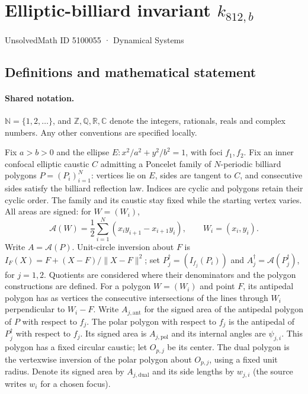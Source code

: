 \documentclass[11pt]{article}
\begin{document}
\setcounter{section}{5100054}
\section{Elliptic-billiard invariant $k_{812,b}$}\label{5100055}
{\small\sffamily UnsolvedMath ID 5100055 · Dynamical Systems}
\subsection{Definitions and mathematical statement}

\paragraph{Shared notation.}$\mathbb N=\{1,2,\ldots\}$, and $\mathbb Z,\mathbb Q,\mathbb R,\mathbb C$ denote the integers, rationals, reals and complex numbers. Any other conventions are specified locally.


Fix $a>b>0$ and the ellipse $E:x^2/a^2+y^2/b^2=1$, with foci $f_1,f_2$. Fix an inner confocal elliptic caustic $C$ admitting a Poncelet family of $N$-periodic billiard polygons $P=(P_i)_{i=1}^N$: vertices lie on $E$, sides are tangent to $C$, and consecutive sides satisfy the billiard reflection law. Indices are cyclic and polygons retain their cyclic order. The family and its caustic stay fixed while the starting vertex varies. All areas are signed: for $W=(W_i)$,
\[\mathcal A(W)=\frac12\sum_{i=1}^N(x_i y_{i+1}-x_{i+1}y_i),\qquad W_i=(x_i,y_i).\]
Write $A=\mathcal A(P)$. Unit-circle inversion about $F$ is $I_F(X)=F+(X-F)/\lVert X-F\rVert^2$; set $P_j^\dagger=(I_{f_j}(P_i))$ and $A_j^\dagger=\mathcal A(P_j^\dagger)$, for $j=1,2$. Quotients are considered where their denominators and the polygon constructions are defined. For a polygon $W=(W_i)$ and point $F$, its antipedal polygon has as vertices the consecutive intersections of the lines through $W_i$ perpendicular to $W_i-F$. Write $A_{j,\mathrm{ant}}$ for the signed area of the antipedal polygon of $P$ with respect to $f_j$. The polar polygon with respect to $f_j$ is the antipedal of $P_j^\dagger$ with respect to $f_j$. Its signed area is $A_{j,\mathrm{pol}}$ and its internal angles are $\psi_{j,i}$. This polygon has a fixed circular caustic; let $O_{p,j}$ be its center. The dual polygon is the vertexwise inversion of the polar polygon about $O_{p,j}$, using a fixed unit radius. Denote its signed area by $A_{j,\mathrm{dual}}$ and its side lengths by $w_{j,i}$ (the source writes $w_i$ for a chosen focus).
\end{document}
